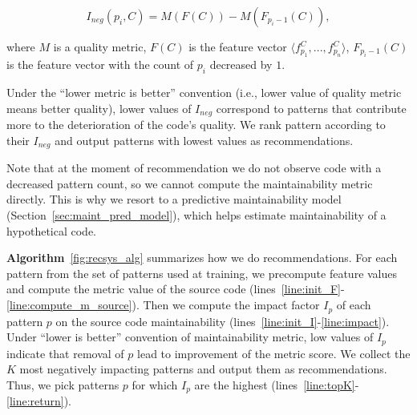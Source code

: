 \begin{equation} \label{eq:impact_factor} I_{\textit{neg}}(p_i, C) = M(F(C)) -
M(F_{p_{i} - 1}(C)), \end{equation}

where $M$ is a quality metric, $F(C)$ is the feature vector $\langle f^C_{p_1},
..., f^C_{p_n} \rangle$, $F_{p_{i} - 1}(C)$ is the feature vector with the count
of $p_i$ decreased by $1$.%


Under the ``lower metric is better'' convention (i.e., lower value of quality metric
means better quality), lower values of $I_{\textit{neg}}$ correspond to patterns
that contribute more to the deterioration of the code's quality. We rank pattern
according to their $I_{\textit{neg}}$ and output patterns with lowest values as
recommendations.

Note that at the moment of recommendation we do not observe code with a
decreased pattern count, so we cannot compute the maintainability metric
directly. This is why we resort to a predictive maintainability model
(Section~\ref{sec:maint_pred_model}), which helps estimate maintainability of a
hypothetical code.



\textbf{Algorithm}~\ref{fig:recsys_alg} summarizes how we do recommendations.
For each pattern from the set of patterns used at training, we
precompute feature values and compute the metric value of the source code
(lines~\ref{line:init_F}-\ref{line:compute_m_source}). Then we compute the
impact factor $I_p$ of each pattern $p$ on the source code maintainability
(lines~\ref{line:init_I}-\ref{line:impact}). Under ``lower is better''
convention of maintainability metric, low values of $I_p$ indicate that removal
of $p$ lead to improvement of the metric score. We collect the $K$ most
negatively impacting patterns and output them as recommendations.  Thus, we
 pick patterns $p$ for which $I_p$ are the highest
(lines~\ref{line:topK}-\ref{line:return}).

